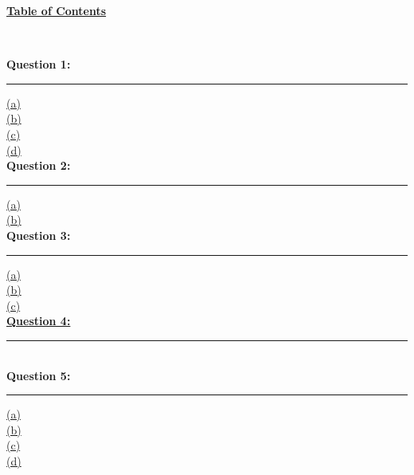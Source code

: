 \documentclass[12pt]{article}
\begin{document}
\begin{center}
    \hypertarget{toc}{\LARGE \underline{\textbf{Table of Contents}}}\\
\end{center}

{\textbf{Question 1:}}
\vspace{1mm}
\hrule
\vspace{1mm}
\hyperlink{1.1}{(a)}\\
\hyperlink{1.2}{(b)}\\
\hyperlink{1.3}{(c)}\\
\hyperlink{1.4}{(d)}\\

\textbf{Question 2:}
\vspace{1mm}
\hrule
\vspace{1mm}
\hyperlink{2.1}{(a)}\\
\hyperlink{2.2}{(b)}\\

\textbf{Question 3:}
\vspace{1mm}
\hrule
\vspace{1mm}
\hyperlink{3.1}{(a)}\\
\hyperlink{3.2}{(b)}\\
\hyperlink{3.3}{(c)}\\

\hyperlink{4}{\textbf{Question 4:}}
\vspace{1mm}
\hrule
\vspace{1mm} \leavevmode \\

{\textbf{Question 5:}}
\vspace{1mm}
\hrule
\vspace{1mm}
\hyperlink{5.1}{(a)}\\
\hyperlink{5.2}{(b)}\\
\hyperlink{5.3}{(c)}\\
\hyperlink{5.4}{(d)}\\

\newpage
\end{document}
